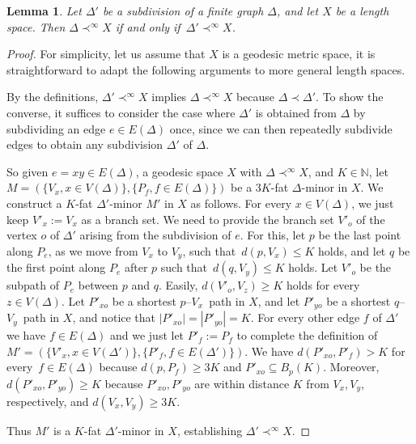 \documentclass[a4paper]{article}
\newtheorem{lemma}[proposition]{Lemma}
\newcommand{\N}{\ensuremath{\mathbb N}}
\renewcommand{\iff}{if and only if}
\newcommand{\fe}{for every}
\newcommand{\st}{such that}
\newcommand{\asm}[2]{\ensuremath{#1 \prec^\infty #2}}
\begin{document}
\begin{lemma} \label{lem subdiv}
Let $\Delta'$ be a subdivision of a finite graph $\Delta$, and let $X$ be a length space. Then \asm{\Delta}{X} \iff\ \asm{\Delta'}{X}.
\end{lemma}
\begin{proof}
For simplicity, let us assume that $X$ is a geodesic metric space, it is straightforward to adapt the following arguments to more general length spaces.

By the definitions, \asm{\Delta'}{X} implies \asm{\Delta}{X} because $\Delta \prec \Delta'$.
To show the converse, it suffices to consider the case where $\Delta'$ is obtained from $\Delta$ by subdividing an edge $e\in E(\Delta)$ once, since we can then repeatedly subdivide edges to obtain any subdivision  $\Delta'$ of $\Delta$.

So given $e=xy\in E(\Delta)$, a geodesic space $X$ with \asm{\Delta}{X}, and $K\in \N$, let $M=(\{V_x, x\in V(\Delta)\}, \{P_f, f\in E(\Delta)\})$ be a $3K$-fat $\Delta$-minor in $X$. We construct a $K$-fat $\Delta'$-minor $M'$ in $X$ as follows. For every $x\in V(\Delta)$, we just keep $V'_x:= V_x$ as a branch set. We need to provide the branch set $V'_o$ of the vertex $o$ of $\Delta'$ arising from the subdivision of $e$. For this, let $p$ be the last point along $P_e$, as we move from $V_x$ to $V_y$, \st\ $d(p,V_x)\leq K$ holds, and let $q$ be the first point along $P_e$ after $p$ \st\ $d(q,V_y)\leq K$ holds. Let $V'_o$ be the subpath of $P_e$ between $p$ and $q$. Easily, $d(V'_o,V_z)\geq K$ holds \fe\ $z\in V(\Delta)$. Let $P'_{xo}$ be a shortest $p$--$V_x$~path in $X$, and let $P'_{yo}$ be a shortest $q$--$V_y$~path in $X$, and notice that $|P'_{xo}|=|P'_{yo}|=K$. For every other edge $f$ of $\Delta'$ we have $f\in E(\Delta)$ and we just let $P'_f:=P_f$ to complete the definition of $M'=(\{V'_x, x\in V(\Delta')\}, \{P'_f, f\in E(\Delta')\})$. We have $d(P'_{xo},P'_f)>K$ \fe\ $f\in E(\Delta)$ because $d(p,P_f)\geq 3K$ and $P'_{xo}\subseteq B_p(K)$. Moreover, $d(P'_{xo},P'_{yo})\geq K$ because $P'_{xo},P'_{yo}$ are within distance $K$ from $V_x,V_y$, respectively, and $d(V_x,V_y)\geq 3K$. 

Thus $M'$ is a $K$-fat $\Delta'$-minor in $X$, establishing \asm{\Delta'}{X}. 

\end{proof}
\end{document}
